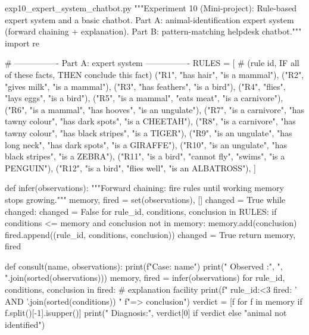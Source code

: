 \documentclass[11pt,a4paper]{article}
\begin{document}
\begin{pycode}{exp10\_expert\_system\_chatbot.py}
"""Experiment 10 (Mini-project): Rule-based expert system and a basic chatbot.
Part A: animal-identification expert system (forward chaining + explanation).
Part B: pattern-matching helpdesk chatbot."""
import re

# ---------------- Part A: expert system ----------------
RULES = [  # (rule id, IF all of these facts, THEN conclude this fact)
    ("R1", {"has hair"}, "is a mammal"),
    ("R2", {"gives milk"}, "is a mammal"),
    ("R3", {"has feathers"}, "is a bird"),
    ("R4", {"flies", "lays eggs"}, "is a bird"),
    ("R5", {"is a mammal", "eats meat"}, "is a carnivore"),
    ("R6", {"is a mammal", "has hooves"}, "is an ungulate"),
    ("R7", {"is a carnivore", "has tawny colour", "has dark spots"},
     "is a CHEETAH"),
    ("R8", {"is a carnivore", "has tawny colour", "has black stripes"},
     "is a TIGER"),
    ("R9", {"is an ungulate", "has long neck", "has dark spots"},
     "is a GIRAFFE"),
    ("R10", {"is an ungulate", "has black stripes"}, "is a ZEBRA"),
    ("R11", {"is a bird", "cannot fly", "swims"}, "is a PENGUIN"),
    ("R12", {"is a bird", "flies well"}, "is an ALBATROSS"),
]


def infer(observations):
    """Forward chaining: fire rules until working memory stops growing."""
    memory, fired = set(observations), []
    changed = True
    while changed:
        changed = False
        for rule_id, conditions, conclusion in RULES:
            if conditions <= memory and conclusion not in memory:
                memory.add(conclusion)
                fired.append((rule_id, conditions, conclusion))
                changed = True
    return memory, fired


def consult(name, observations):
    print(f"Case: {name}")
    print("   Observed :", ", ".join(sorted(observations)))
    memory, fired = infer(observations)
    for rule_id, conditions, conclusion in fired:       # explanation facility
        print(f"   {rule_id:<3} fired: {' AND '.join(sorted(conditions))} "
              f"=> {conclusion}")
    verdict = [f for f in memory if f.split()[-1].isupper()]
    print("   Diagnosis:", verdict[0] if verdict else "animal not identified")



\end{pycode}
\end{document}
